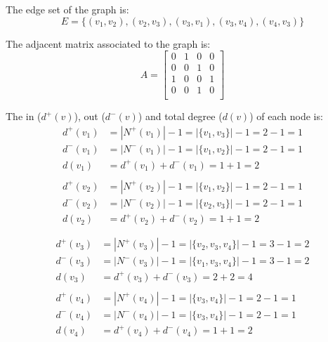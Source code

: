 \documentclass{article}
\begin{document}
    \par\noindent The edge set of the graph is:
    \[E=\{(v_{1},v_{2}),(v_{2},v_{3}),(v_{3},v_{1}),(v_{3},v_{4}),(v_{4},v_{3})\}\]
    
    \par\noindent The adjacent matrix associated to the graph is:
    \begin{equation*}
    A =
        \begin{bmatrix}
        0 & 1 & 0 & 0\\
        0 & 0 & 1 & 0\\
        1 & 0 & 0 & 1\\
        0 & 0 & 1 & 0\\
        \end{bmatrix}
    \end{equation*}
    
    \par\noindent The in (\(d^{+}(v)\)), out (\(d^{-}(v)\)) and total degree (\(d(v)\)) of each node is:
    \begin{align*}
    d^{+}(v_{1}) &= |N^{+}(v_{1})|-1 = |\{v_{1},v_{3}\}|-1 = 2-1 = 1\\
    d^{-}(v_{1}) &= |N^{-}(v_{1})|-1 = |\{v_{1},v_{2}\}|-1 = 2-1 = 1\\
    d(v_{1}) &= d^{+}(v_{1}) + d^{-}(v_{1}) = 1+1 = 2\\\\
    d^{+}(v_{2}) &= |N^{+}(v_{2})|-1 = |\{v_{1},v_{2}\}|-1 = 2-1 = 1\\
    d^{-}(v_{2}) &= |N^{-}(v_{2})|-1 = |\{v_{2},v_{3}\}|-1 = 2-1 = 1\\
    d(v_{2}) &= d^{+}(v_{2}) + d^{-}(v_{2}) = 1+1 = 2\\\\
    \end{align*}
    \begin{align*}
    d^{+}(v_{3}) &= |N^{+}(v_{3})|-1 = |\{v_{2},v_{3},v_{4}\}|-1 = 3-1 = 2\\
    d^{-}(v_{3}) &= |N^{-}(v_{3})|-1 = |\{v_{1},v_{3},v_{4}\}|-1 = 3-1 = 2\\
    d(v_{3}) &= d^{+}(v_{3}) + d^{-}(v_{3}) = 2+2 = 4\\\\
    d^{+}(v_{4}) &= |N^{+}(v_{4})|-1 = |\{v_{3},v_{4}\}|-1 = 2-1 = 1\\
    d^{-}(v_{4}) &= |N^{-}(v_{4})|-1 = |\{v_{3},v_{4}\}|-1 = 2-1 = 1\\
    d(v_{4}) &= d^{+}(v_{4}) + d^{-}(v_{4}) = 1+1 = 2\\\\
    \end{align*}
    
\end{document}
